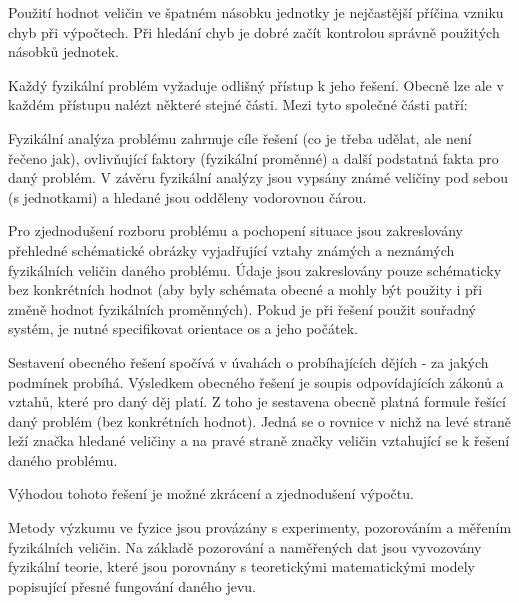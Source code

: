 Použití hodnot veličin ve špatném násobku jednotky je nejčastější příčina vzniku chyb při výpočtech. Při hledání chyb je dobré začít kontrolou správně použitých násobků jednotek.


Každý fyzikální problém vyžaduje odlišný přístup k jeho řešení. Obecně lze ale v každém přístupu nalézt některé stejné části. Mezi tyto společné části patří:


Fyzikální analýza problému zahrnuje cíle řešení (co je třeba udělat, ale není řečeno jak), ovlivňující faktory (fyzikální proměnné) a další podstatná fakta pro daný problém. V závěru fyzikální analýzy jsou vypsány známé veličiny pod sebou (s jednotkami) a hledané jsou odděleny vodorovnou čárou.


Pro zjednodušení rozboru problému a pochopení situace jsou zakreslovány přehledné schématické obrázky vyjadřující vztahy známých a neznámých fyzikálních veličin daného problému. Údaje jsou zakreslovány pouze schématicky bez konkrétních hodnot (aby byly schémata obecné a mohly být použity i při změně hodnot fyzikálních proměnných). Pokud je při řešení použit souřadný systém, je nutné specifikovat orientace os a jeho počátek.


Sestavení obecného řešení spočívá v úvahách o probíhajících dějích - za jakých podmínek probíhá. Výsledkem obecného řešení je soupis odpovídajících zákonů a vztahů, které pro daný děj platí. Z toho je sestavena obecně platná formule řešící daný problém (bez konkrétních hodnot). Jedná se o rovnice v nichž na levé straně leží značka hledané veličiny a na pravé straně značky veličin vztahující se k řešení daného problému. 

Výhodou tohoto řešení je možné zkrácení a zjednodušení výpočtu.


Metody výzkumu ve fyzice jsou provázány s experimenty, pozorováním a měřením fyzikálních veličin. Na základě pozorování a naměřených dat jsou vyvozovány fyzikální teorie, které jsou porovnány s teoretickými matematickými modely popisující přesné fungování daného jevu.

